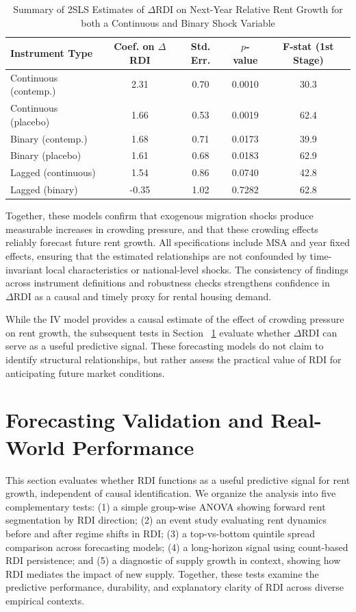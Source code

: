 \documentclass[APA,Times1COL]{WileyNJDv5} %
\begin{document}
\begin{table}[h]
	\centering
	\caption{Summary of 2SLS Estimates of $\Delta \text{RDI}$ on Next-Year Relative Rent Growth for both a Continuous and Binary Shock Variable}
	\label{tab:iv-summary}
	\begin{tabular}{lcccc}
		\toprule
		Instrument Type & Coef. on $\Delta$RDI & Std. Err. & $p$-value & F-stat (1st Stage) \\
		\midrule
		Continuous (contemp.) & 2.31 & 0.70 & 0.0010 & 30.3 \\
		Continuous (placebo)  & 1.66 & 0.53 & 0.0019 & 62.4 \\
		Binary (contemp.)     & 1.68 & 0.71 & 0.0173 & 39.9 \\
		Binary (placebo)      & 1.61 & 0.68 & 0.0183 & 62.9 \\
		Lagged (continuous)   & 1.54 & 0.86 & 0.0740 & 42.8 \\
		Lagged (binary)       & -0.35 & 1.02 & 0.7282 & 62.8 \\
		\bottomrule
	\end{tabular}
\end{table}

Together, these models confirm that exogenous migration shocks produce measurable increases in crowding pressure, and that these crowding effects reliably forecast future rent growth. All specifications include MSA and year fixed effects, ensuring that the estimated relationships are not confounded by time-invariant local characteristics or national-level shocks. The consistency of findings across instrument definitions and robustness checks strengthens confidence in \(\Delta \text{RDI}\) as a causal and timely proxy for rental housing demand.

While the IV model provides a causal estimate of the effect of crowding pressure on rent growth, the subsequent tests in Section ~\ref{forecasting-validation} evaluate whether \(\Delta \text{RDI}\) can serve as a useful predictive signal. These forecasting models do not claim to identify structural relationships, but rather assess the practical value of RDI for anticipating future market conditions.




\section{Forecasting Validation and Real-World Performance}
\label{forecasting-validation}
This section evaluates whether RDI functions as a useful predictive signal for rent growth, independent of causal identification. We organize the analysis into five complementary tests: (1) a simple group-wise ANOVA showing forward rent segmentation by RDI direction; (2) an event study evaluating rent dynamics before and after regime shifts in RDI; (3) a top-vs-bottom quintile spread comparison across forecasting models; (4) a long-horizon signal using count-based RDI persistence; and (5) a diagnostic of supply growth in context, showing how RDI mediates the impact of new supply. Together, these tests examine the predictive performance, durability, and explanatory clarity of RDI across diverse empirical contexts.
\end{document}

